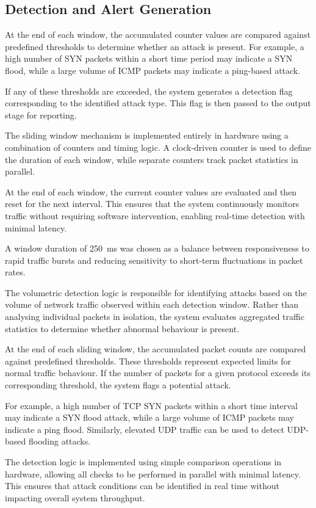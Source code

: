 \subsection{Detection and Alert Generation}
At the end of each window, the accumulated counter values are compared against
predefined thresholds to determine whether an attack is present. For example, a
high number of SYN packets within a short time period may indicate a SYN flood,
while a large volume of ICMP packets may indicate a ping-based attack.

If any of these thresholds are exceeded, the system generates a detection flag
corresponding to the identified attack type. This flag is then passed to the
output stage for reporting.

The sliding window mechanism is implemented entirely in hardware using a
combination of counters and timing logic. A clock-driven counter is used to
define the duration of each window, while separate counters track packet
statistics in parallel.

At the end of each window, the current counter values are evaluated and then
reset for the next interval. This ensures that the system continuously monitors
traffic without requiring software intervention, enabling real-time detection
with minimal latency.

A window duration of 250~ms was chosen as a balance between responsiveness to rapid traffic bursts and reducing sensitivity to short-term fluctuations in packet rates.

The volumetric detection logic is responsible for identifying attacks based on
the volume of network traffic observed within each detection window. Rather
than analysing individual packets in isolation, the system evaluates aggregated
traffic statistics to determine whether abnormal behaviour is present.

At the end of each sliding window, the accumulated packet counts are compared
against predefined thresholds. These thresholds represent expected limits for
normal traffic behaviour. If the number of packets for a given protocol exceeds
its corresponding threshold, the system flags a potential attack.

For example, a high number of TCP SYN packets within a short time interval may
indicate a SYN flood attack, while a large volume of ICMP packets may indicate
a ping flood. Similarly, elevated UDP traffic can be used to detect UDP-based
flooding attacks.

The detection logic is implemented using simple comparison operations in
hardware, allowing all checks to be performed in parallel with minimal latency.
This ensures that attack conditions can be identified in real time without
impacting overall system throughput.

